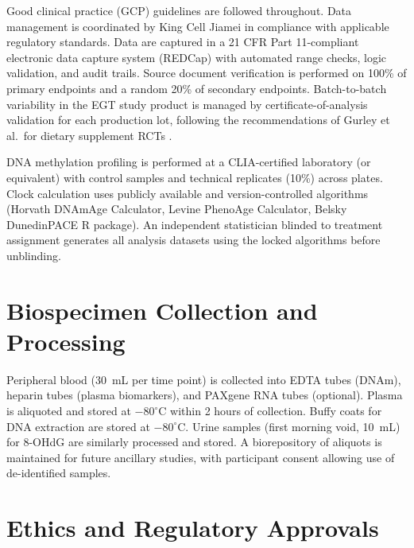 \documentclass[11pt,a4paper]{article}
\begin{document}
Good clinical practice (GCP) guidelines are followed throughout. Data management is coordinated by King Cell Jiamei in compliance with applicable regulatory standards. Data are captured in a 21 CFR Part 11-compliant electronic data capture system (REDCap) with automated range checks, logic validation, and audit trails. Source document verification is performed on 100\% of primary endpoints and a random 20\% of secondary endpoints. Batch-to-batch variability in the EGT study product is managed by certificate-of-analysis validation for each production lot, following the recommendations of Gurley et al.\ for dietary supplement RCTs \cite{gurley2021}.

DNA methylation profiling is performed at a CLIA-certified laboratory (or equivalent) with control samples and technical replicates (10\%) across plates. Clock calculation uses publicly available and version-controlled algorithms (Horvath DNAmAge Calculator, Levine PhenoAge Calculator, Belsky DunedinPACE R package). An independent statistician blinded to treatment assignment generates all analysis datasets using the locked algorithms before unblinding.

\section{Biospecimen Collection and Processing}

Peripheral blood (30~mL per time point) is collected into EDTA tubes (DNAm), heparin tubes (plasma biomarkers), and PAXgene RNA tubes (optional). Plasma is aliquoted and stored at $-80^\circ$C within 2 hours of collection. Buffy coats for DNA extraction are stored at $-80^\circ$C. Urine samples (first morning void, 10~mL) for 8-OHdG are similarly processed and stored. A biorepository of aliquots is maintained for future ancillary studies, with participant consent allowing use of de-identified samples.

\section{Ethics and Regulatory Approvals}
\end{document}
